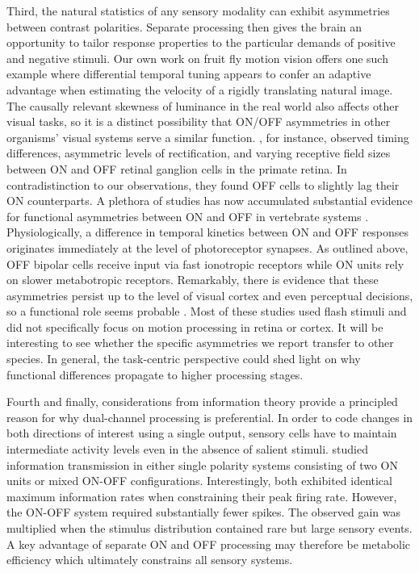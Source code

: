 Third, the natural statistics of any sensory modality can exhibit asymmetries between contrast polarities. Separate processing then gives the brain an opportunity to tailor response properties to the particular demands of positive and negative stimuli. Our own work on fruit fly motion vision offers one such example where differential temporal tuning appears to confer an adaptive advantage when estimating the velocity of a rigidly translating natural image. The causally relevant skewness of luminance in the real world also affects other visual tasks, so it is a distinct possibility that ON/OFF asymmetries in other organisms' visual systems serve a similar function. \citet{Chichilnisky:2002wu}, for instance, observed timing differences, asymmetric levels of rectification, and varying receptive field sizes between ON and OFF retinal ganglion cells in the primate retina. In contradistinction to our observations, they found OFF cells to slightly lag their ON counterparts. A plethora of studies has now accumulated substantial evidence for functional asymmetries between ON and OFF in vertebrate systems \citep{Zemon:1988aa,Zaghloul:2003aa,Jin:2011aa,Yeh:2009aa,Pandarinath:2010hg,Copenhagen:1983aa,Burkhardt:2011aa,Gollisch:2008jv}. Physiologically, a difference in temporal kinetics between ON and OFF responses originates immediately at the level of photoreceptor synapses. As outlined above, OFF bipolar cells receive input via fast ionotropic receptors while ON units rely on slower metabotropic receptors. Remarkably, there is evidence that these asymmetries persist up to the level of visual cortex and even perceptual decisions, so a functional role seems probable \citep{Komban:2014cq}. Most of these studies used flash stimuli and did not specifically focus on motion processing in retina or cortex. It will be interesting to see whether the specific asymmetries we report transfer to other species. In general, the task-centric perspective could shed light on why functional differences propagate to higher processing stages.

Fourth and finally, considerations from information theory provide a principled reason for why dual-channel processing is preferential. In order to code changes in both directions of interest using a single output, sensory cells have to maintain intermediate activity levels even in the absence of salient stimuli. \citet{Gjorgjieva:2014ks} studied information transmission in either single polarity systems consisting of two ON units or mixed ON-OFF configurations. Interestingly, both exhibited identical maximum information rates when constraining their peak firing rate. However, the ON-OFF system required substantially fewer spikes. The observed gain was multiplied when the stimulus distribution contained rare but large sensory events. A key advantage of separate ON and OFF processing may therefore be metabolic efficiency which ultimately constrains all sensory systems.

